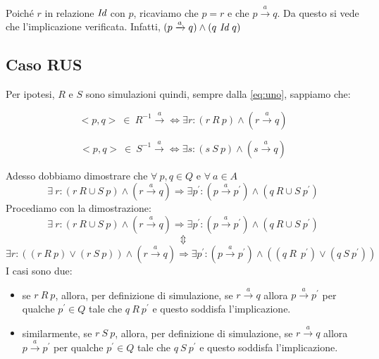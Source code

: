 			Poich\'e $r$ \eacc in relazione $\emph{Id}$ con $p$, ricaviamo che $p = r$ e che $p \xrightarrow{a} q$. Da questo si vede che l'implicazione \eacc verificata. Infatti, $(p \xrightarrow{a} q) \land (q \ \emph{Id} \ q)$
			
			\newpage
			
		\subsection{Caso RUS}
		
			Per ipotesi, $R$ e $S$ sono simulazioni quindi, sempre dalla \eqref{eq:uno}, sappiamo che:
			\vspace{-10 mm}
			\begin{center}
				\begin{equation}
				\label{tre}
				<p,q>\ \in \ R^{-1} \xrightarrow{a}  \Leftrightarrow \exists r: (r \ R \ p) \land (r \xrightarrow{a} q)
				\end{equation}
			\end{center}
			\vspace{-10 mm}
			\begin{center}
				\begin{equation}
				\label{quattro}
				<p,q>\ \in \ S^{-1} \xrightarrow{a}  \Leftrightarrow \exists s: (s \ S \ p) \land (s \xrightarrow{a} q)
				\end{equation}
			\end{center}
			Adesso dobbiamo dimostrare che $\forall \ p,q \in Q$ e $\forall \ a \in A$ $$\exists \ r: (r \ R\cup S \ p) \land (r \xrightarrow{a} q) \Rightarrow \exists p^{'}: (p \xrightarrow{a} p^{'})\land (q \ R\cup S \ p^{'})$$
			Procediamo con la dimostrazione: 
			$$\exists \ r: (r \ R\cup S \ p) \land (r \xrightarrow{a} q) \Rightarrow \exists p^{'}: (p \xrightarrow{a} p^{'})\land (q \ R\cup S \ p^{'})$$
			\vspace{-8 mm}
			$$\Updownarrow$$
			$$\exists r: ((r \ R\ p) \lor (r \ S\ p)) \land (r \xrightarrow{a} q) \Rightarrow \exists p^{'}: (p \xrightarrow{a} p^{'})\land ((q \ R\ \ p^{'})\lor(q \ S \ p^{'}))$$
			I casi sono due:
			\begin{itemize}
				\item se $r \ R\ p$, allora, per definizione di simulazione, se $r \xrightarrow{a} q$ allora $p\xrightarrow{a} p^{'}$ per qualche $p^{'}\in Q$ tale che $q \ R \ p^{'}$ e questo soddisfa l'implicazione.
				\item similarmente, se $r \ S\ p$, allora, per definizione di simulazione, se $r \xrightarrow{a} q$ allora $p\xrightarrow{a} p^{'}$ per qualche $p^{'}\in Q$ tale che $q \ S \ p^{'}$ e questo soddisfa l'implicazione.
			\end{itemize}
			
